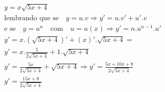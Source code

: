 \begin{ex}
\begin{align}
&y=x\sqrt{5x+4}\nonumber\\
&\text{lembrando que se}\quad y=u.v \Rightarrow y'=u.v'+u'.v\nonumber\\
&\text{e se}\quad y=u^n\quad\text{com}\quad u=u(x) \Rightarrow y'=n.u^{n-1}.u'\nonumber\\
&y'=x.(\sqrt{5x+4})'+(x)'.\sqrt{5x+4}=\nonumber\\
&y'=x.\frac{5}{2\sqrt{5x+4}}+1.\sqrt{5x+4}\nonumber\\
&y'=\frac{5x}{2\sqrt{5x+4}}+\sqrt{5x+4}\Rightarrow y'=\frac{5x+10x+8}{2\sqrt{5x+4}}\nonumber\\
&y'=\frac{15x+8}{2\sqrt{5x+4}}\nonumber
\end{align}
\end{ex}